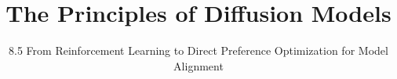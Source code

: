 ﻿%

\graphicspath{{../images/}}
\title{The Principles of Diffusion Models}
\subtitle{8.5 From Reinforcement Learning to Direct Preference Optimization for Model Alignment}


\begin{frame}
    \titlepage
\end{frame}



